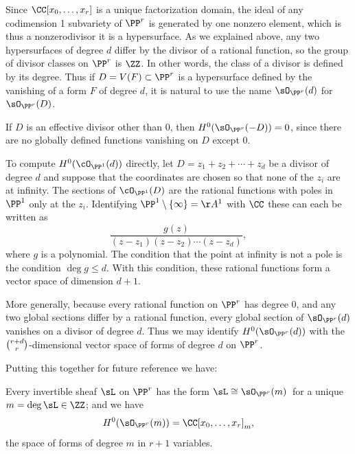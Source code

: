\begin{example} \label{linear series on Pr} Since $\CC[x_0,\dots,x_r]$ is a 
unique factorization domain, the ideal of any codimension 1 subvariety of $\PP^r$ is generated by one
nonzero element, which is thus a nonzerodivisor \emdash it is a hypersurface.  As we explained above,
any two hypersurfaces of degree $d$ differ by the divisor of a rational function, so
the group of divisor classes on $\PP^r$ is $\ZZ$.
In other words,
the class of a divisor is defined by its degree.
Thus if $D = V(F)\subset \PP^{r}$ is a hypersurface defined by the vanishing of a  form 
$F$ of degree $d$,
it is natural to use the name 
$\sO_{\PP^r}(d)$
%
  for $\sO_{\PP^r}(D)$.

If $D$ is an effective divisor other than 0, then $H^{0}(\sO_{\PP^{r}}(-D)) = 0$, since there are
no globally defined functions vanishing on $D$ except 0.
 
To compute $H^0(\cO_{\PP^1} (d))$ directly, let $D = z_1 +z_2
+\cdots+z_d$ be a divisor of degree 
$d$ 
and suppose that the coordinates are chosen so that none of the $z_i$ are at infinity. The sections of $\cO_{\PP^1} (D)$ are the rational functions with poles in $\PP^1$ only at 
the $z_i$. Identifying $\PP^1\setminus \{\infty\} = \AA^1$ with $\CC$ these can each be written as
$$
\frac{g(z)}{(z-z_1)(z-z_2)\cdots(z-z_d)}
,
$$
where $g$ is a polynomial. The condition that the point at infinity is
not a pole is the condition $\deg g \leq d$. With this condition,
these rational functions form a vector space of dimension $d+1$.

More generally, because every
rational function on $\PP^{r}$ has degree 0, and any two global sections differ by a rational
function, 
every global section of $\sO_{\PP^{r}}(d)$ vanishes on a divisor of degree $d$. Thus
we may identify $H^{0}(\sO_{\PP^{r}}(d))$ with the $\tbinom{r+d}{r}$-dimensional vector space of forms of degree $d$ on $\PP^{r}$.

Putting this together for future reference we have:
%

\begin{proposition}
Every invertible sheaf $\sL$ on $\PP^r$ has the form $\sL \cong\sO_{\PP^r}(m)$ 
\,for a unique $m = \deg \sL \in \ZZ$; and we have
 $$
 H^0(\sO_{\PP^r}(m)) = 
\CC[x_0,\dots, x_r]_m
,
 $$
 the space of forms of degree $m$ in $r+1$ variables.
\end{proposition}
\end{example}

